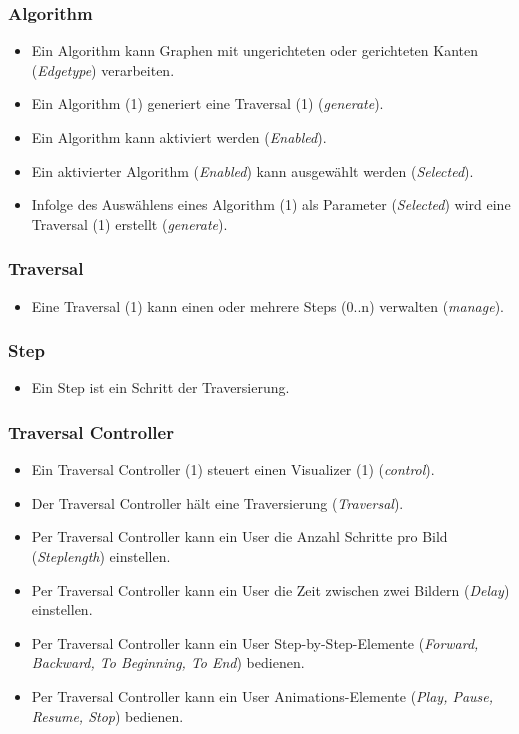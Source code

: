\subsubsection{Algorithm}
\label{subsubsec:Algorithm}
\begin{itemize}
  \item Ein Algorithm kann Graphen mit ungerichteten oder gerichteten Kanten (\textit{Edgetype}) verarbeiten.
  \item Ein Algorithm (1) generiert eine Traversal (1) (\textit{generate}).
  \item Ein Algorithm kann aktiviert werden (\textit{Enabled}).
  \item Ein aktivierter Algorithm (\textit{Enabled}) kann ausgew\"ahlt werden (\textit{Selected}).
  \item Infolge des Ausw\"ahlens eines Algorithm (1) als Parameter (\textit{Selected}) wird eine Traversal (1) erstellt (\textit{generate}).
\end{itemize}
% 
\subsubsection{Traversal}
\label{subsubsec:Traversal}
\begin{itemize}
  \item Eine Traversal (1) kann einen oder mehrere Steps (0..n) verwalten (\textit{manage}).
\end{itemize}

\subsubsection{Step}
\label{subsubsec:Step}
\begin{itemize}
  \item Ein Step ist ein Schritt der Traversierung.
\end{itemize}

\subsubsection{Traversal Controller}
\label{subsubsec:Traversal Controller}
\begin{itemize}
  \item Ein Traversal Controller (1) steuert einen Visualizer (1) (\textit{control}).
  \item Der Traversal Controller h\"alt eine Traversierung (\textit{Traversal}).
  \item Per Traversal Controller kann ein User die Anzahl Schritte pro Bild (\textit{Steplength}) einstellen.
  \item Per Traversal Controller kann ein User die Zeit zwischen zwei Bildern (\textit{Delay}) einstellen.
  \item Per Traversal Controller kann ein User Step-by-Step-Elemente (\textit{Forward, Backward, To Beginning, To End}) bedienen.
  \item Per Traversal Controller kann ein User Animations-Elemente (\textit{Play, Pause, Resume, Stop}) bedienen.
\end{itemize}

